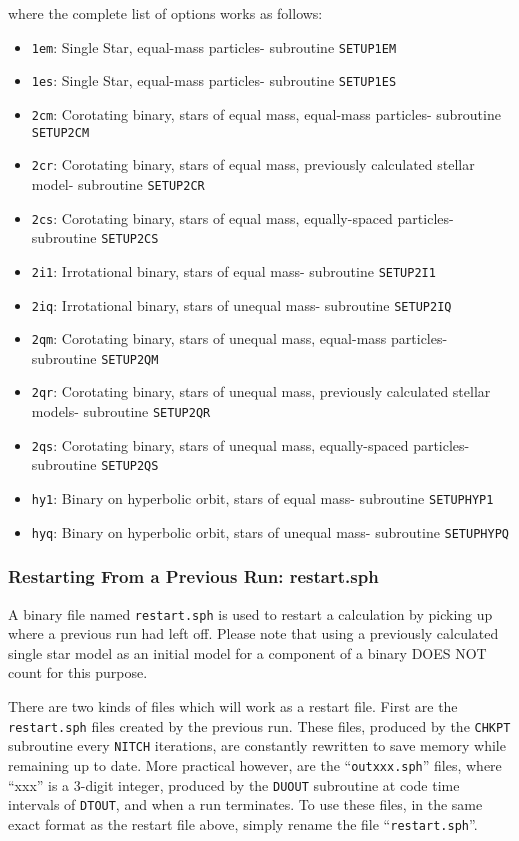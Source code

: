 
where the complete list of options works as follows:
\begin{itemize}
\item {\tt 1em}: Single Star, equal-mass particles- subroutine {\tt SETUP1EM}
\item {\tt 1es}: Single Star, equal-mass particles- subroutine {\tt SETUP1ES}
\item {\tt 2cm}: Corotating binary, stars of equal mass, 
equal-mass particles- subroutine {\tt SETUP2CM}
\item {\tt 2cr}: Corotating binary, stars of equal mass, previously
calculated stellar model- subroutine {\tt SETUP2CR}
\item {\tt 2cs}: Corotating binary, stars of equal mass, 
equally-spaced particles- subroutine {\tt SETUP2CS}
\item {\tt 2i1}: Irrotational binary, stars of equal mass- 
subroutine {\tt SETUP2I1}
\item {\tt 2iq}: Irrotational binary, stars of unequal mass- 
subroutine {\tt SETUP2IQ}
\item {\tt 2qm}: Corotating binary, stars of unequal mass, 
equal-mass particles- subroutine {\tt SETUP2QM}
\item {\tt 2qr}: Corotating binary, stars of unequal mass, 
previously calculated stellar models- subroutine {\tt SETUP2QR}
\item {\tt 2qs}: Corotating binary, stars of unequal mass, 
equally-spaced particles- subroutine {\tt SETUP2QS}
\item {\tt hy1}: Binary on hyperbolic orbit, stars of equal mass- 
subroutine {\tt SETUPHYP1}
\item {\tt hyq}: Binary on hyperbolic orbit, stars of unequal mass- 
subroutine {\tt SETUPHYPQ}
\end{itemize}

\subsubsection{Restarting From a Previous Run: restart.sph}
A binary file named {\tt restart.sph} is used to restart a calculation
by picking up where a previous run had left off.  Please note that
using a previously calculated single star model as an initial model
for a component of a binary DOES NOT count for this purpose.  

There are two kinds of files which will work as a restart file.  First
are the {\tt restart.sph} files created by the previous run.  These
files, produced by the {\tt CHKPT} subroutine every {\tt NITCH}
iterations, are constantly rewritten to save memory while remaining up
to date.  More practical however, are the ``{\tt outxxx.sph}'' files,
where ``xxx'' is a 3-digit integer, produced by the {\tt DUOUT}
subroutine at code time intervals of {\tt DTOUT}, and when a run terminates.  
To use these files, in the same exact format as the restart file
above, simply rename the file ``{\tt restart.sph}''.

